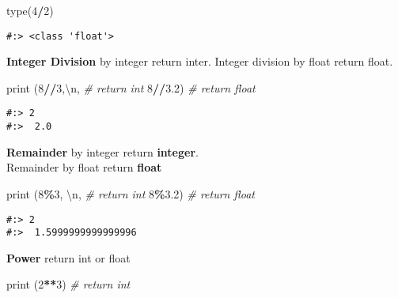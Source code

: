\documentclass[
]{book}
\newenvironment{Shaded}{\begin{snugshade}}{\end{snugshade}}
\newcommand{\BuiltInTok}[1]{#1}
\newcommand{\CharTok}[1]{\textcolor[rgb]{0.5,0.5,0.5}{#1}}
\newcommand{\CommentTok}[1]{\textcolor[rgb]{0.37,0.37,0.37}{\textit{#1}}}
\newcommand{\DecValTok}[1]{\textcolor[rgb]{0.06,0.06,0.06}{#1}}
\newcommand{\FloatTok}[1]{\textcolor[rgb]{0.06,0.06,0.06}{#1}}
\newcommand{\NormalTok}[1]{#1}
\newcommand{\OperatorTok}[1]{\textcolor[rgb]{0.43,0.43,0.43}{\textbf{#1}}}
\newcommand{\StringTok}[1]{\textcolor[rgb]{0.5,0.5,0.5}{#1}}
\begin{document}
\begin{Shaded}
\begin{Highlighting}[]
\BuiltInTok{type}\NormalTok{(}\DecValTok{4}\OperatorTok{/}\DecValTok{2}\NormalTok{)}
\end{Highlighting}
\end{Shaded}

\begin{verbatim}
#:> <class 'float'>
\end{verbatim}

\textbf{Integer Division} by integer return inter. Integer division by float return float.

\begin{Shaded}
\begin{Highlighting}[]
\BuiltInTok{print}\NormalTok{ (}\DecValTok{8}\OperatorTok{//}\DecValTok{3}\NormalTok{,}\StringTok{\textquotesingle{}}\CharTok{\textbackslash{}n}\StringTok{\textquotesingle{}}\NormalTok{,    }\CommentTok{\# return int}
       \DecValTok{8}\OperatorTok{//}\FloatTok{3.2}\NormalTok{)       }\CommentTok{\# return float}
\end{Highlighting}
\end{Shaded}

\begin{verbatim}
#:> 2 
#:>  2.0
\end{verbatim}

\textbf{Remainder} by integer return \textbf{integer}.\\
Remainder by float return \textbf{float}

\begin{Shaded}
\begin{Highlighting}[]
\BuiltInTok{print}\NormalTok{ (}\DecValTok{8}\OperatorTok{\%}\DecValTok{3}\NormalTok{, }\StringTok{\textquotesingle{}}\CharTok{\textbackslash{}n}\StringTok{\textquotesingle{}}\NormalTok{,    }\CommentTok{\# return int}
       \DecValTok{8}\OperatorTok{\%}\FloatTok{3.2}\NormalTok{)        }\CommentTok{\# return float}
\end{Highlighting}
\end{Shaded}

\begin{verbatim}
#:> 2 
#:>  1.5999999999999996
\end{verbatim}

\textbf{Power} return int or float

\begin{Shaded}
\begin{Highlighting}[]
\BuiltInTok{print}\NormalTok{ (}\DecValTok{2}\OperatorTok{**}\DecValTok{3}\NormalTok{)    }\CommentTok{\# return int}
\end{Highlighting}
\end{Shaded}
\end{document}
